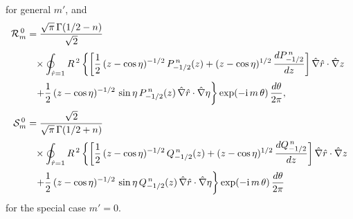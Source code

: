 \documentclass[12pt,prb,aps]{revtex4-1}
\begin{document}
for general $m'$, and 
\begin{align}\label{e356}
{\cal R}_m^{\,0} &=
\frac{\sqrt{\pi}\,\Gamma(1/2-n)}{\sqrt{2}}
\nonumber\\[0.5ex]&\phantom{=}\times \oint_{\hat{r}=1}
R^{\,2}\left\{\left[\frac{1}{2}\,(z-\cos\eta)^{-1/2}\,P_{-1/2}^{\,n}(z)+(z-\cos\eta)^{1/2}\,\frac{dP_{-1/2}^{\,n}}{dz}\right]\hat{\nabla}\hat{r}\cdot\hat{\nabla} z
\right.\nonumber\\[0.5ex]&
\phantom{=}\left.+\frac{1}{2}\,(z-\cos\eta)^{-1/2}\,\sin\eta\,P_{-1/2}^{\,n}(z)\,\hat{\nabla}\hat{r}\cdot\hat{\nabla} \eta
\right\}\exp(-{\rm i}\,m\,\theta)\,\frac{d\theta}{2\pi}
,\\[0.5ex]
{\cal S}_m^{\,0} &=\frac{\sqrt{2}}{\sqrt{\pi}\,\Gamma(1/2+n)}
\nonumber\\[0.5ex]&\phantom{=}\times \oint_{\hat{r}=1}
R^{\,2}\left\{\left[\frac{1}{2}\,(z-\cos\eta)^{-1/2}\,Q_{-1/2}^{\,n}(z)+(z-\cos\eta)^{1/2}\,\frac{dQ_{-1/2}^{\,n}}{dz}\right]\hat{\nabla}\hat{r}\cdot\hat{\nabla} z
\right.\nonumber\\[0.5ex]&
\phantom{=}\left.+\frac{1}{2}\,(z-\cos\eta)^{-1/2}\,\sin\eta\,Q_{-1/2}^{\,n}(z)\,\hat{\nabla}\hat{r}\cdot\hat{\nabla} \eta
\right\}\exp(-{\rm i}\,m\,\theta)\,\frac{d\theta}{2\pi}
\end{align}
for the special case $m'=0$.
\end{document}

